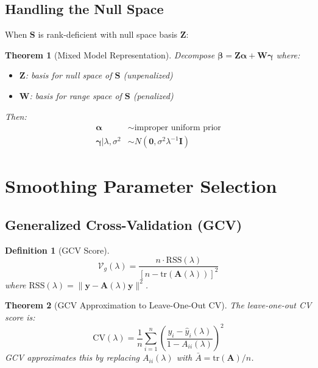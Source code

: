 \documentclass[12pt]{article}
\newtheorem{theorem}{Theorem}
\newtheorem{definition}{Definition}
\newcommand{\tr}{\text{tr}}
\begin{document}
\subsection{Handling the Null Space}

When $\mathbf{S}$ is rank-deficient with null space basis $\mathbf{Z}$:

\begin{theorem}[Mixed Model Representation]
Decompose $\bm{\beta} = \mathbf{Z}\bm{\alpha} + \mathbf{W}\bm{\gamma}$ where:
\begin{itemize}
    \item $\mathbf{Z}$: basis for null space of $\mathbf{S}$ (unpenalized)
    \item $\mathbf{W}$: basis for range space of $\mathbf{S}$ (penalized)
\end{itemize}
Then:
\begin{align}
\bm{\alpha} &\sim \text{improper uniform prior} \\
\bm{\gamma} | \lambda, \sigma^2 &\sim N(\mathbf{0}, \sigma^2\lambda^{-1}\mathbf{I})
\end{align}
\end{theorem}

\section{Smoothing Parameter Selection}

\subsection{Generalized Cross-Validation (GCV)}

\begin{definition}[GCV Score]
\begin{equation}
\mathcal{V}_g(\lambda) = \frac{n \cdot \text{RSS}(\lambda)}{[n - \tr(\mathbf{A}(\lambda))]^2}
\end{equation}
where $\text{RSS}(\lambda) = \|\mathbf{y} - \mathbf{A}(\lambda)\mathbf{y}\|^2$.
\end{definition}

\begin{theorem}[GCV Approximation to Leave-One-Out CV]
The leave-one-out CV score is:
\begin{equation}
\text{CV}(\lambda) = \frac{1}{n}\sum_{i=1}^n \left(\frac{y_i - \hat{y}_i(\lambda)}{1 - A_{ii}(\lambda)}\right)^2
\end{equation}
GCV approximates this by replacing $A_{ii}(\lambda)$ with $\bar{A} = \tr(\mathbf{A})/n$.
\end{theorem}
\end{document}
